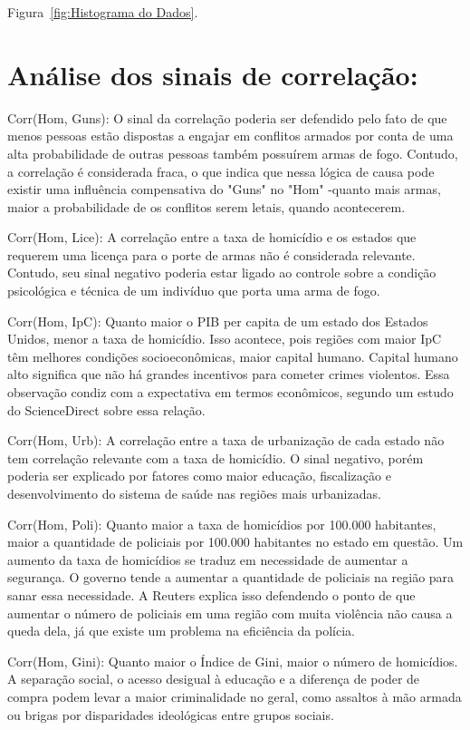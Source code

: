 \documentclass[12pt]{article}
\begin{document}
Figura~\ref{fig:Histograma do Dados}.

\section{\textbf{Análise dos sinais de correlação:}}

Corr(Hom, Guns): O sinal da correlação poderia ser defendido pelo fato de que menos pessoas estão dispostas a engajar em conflitos armados por conta de uma alta probabilidade de outras pessoas também possuírem armas de fogo. Contudo, a correlação é considerada fraca, o que indica que nessa lógica de causa pode existir uma influência compensativa do "Guns" no "Hom" -quanto mais armas, maior a probabilidade de os conflitos serem letais, quando acontecerem.

Corr(Hom, Lice): A correlação entre a taxa de homicídio e os estados que requerem uma licença para o porte de armas não é considerada relevante. Contudo, seu sinal negativo poderia estar ligado ao controle sobre a condição psicológica e técnica de um indivíduo que porta uma arma de fogo. 

Corr(Hom, IpC): Quanto maior o PIB per capita de um estado dos Estados Unidos, menor a taxa de homicídio. Isso acontece, pois regiões com maior IpC têm melhores condições socioeconômicas, maior capital humano. Capital humano alto significa que não há grandes incentivos para cometer crimes violentos.
Essa observação condiz com a expectativa em termos econômicos, segundo um estudo do ScienceDirect sobre essa relação.

Corr(Hom, Urb): A correlação entre a taxa de urbanização de cada estado não tem correlação relevante com a taxa de homicídio. O sinal negativo, porém poderia ser explicado por fatores como maior educação, fiscalização e desenvolvimento do sistema de saúde nas regiões mais urbanizadas.

Corr(Hom, Poli): Quanto maior a taxa de homicídios por 100.000 habitantes, maior a quantidade de policiais por 100.000 habitantes no estado em questão. Um aumento da taxa de homicídios se traduz em necessidade de aumentar a segurança. O governo tende a aumentar a quantidade de policiais na região para sanar essa necessidade.
A Reuters explica isso defendendo o ponto de que aumentar o número de
policiais em uma região com muita violência não causa a queda dela, já que existe um problema na eficiência da polícia.

Corr(Hom, Gini): Quanto maior o Índice de Gini, maior o número de homicídios. A separação social, o acesso desigual à educação e a diferença de poder de compra podem levar a maior criminalidade no geral, como assaltos à mão armada ou brigas por disparidades ideológicas entre grupos sociais.
\end{document}
